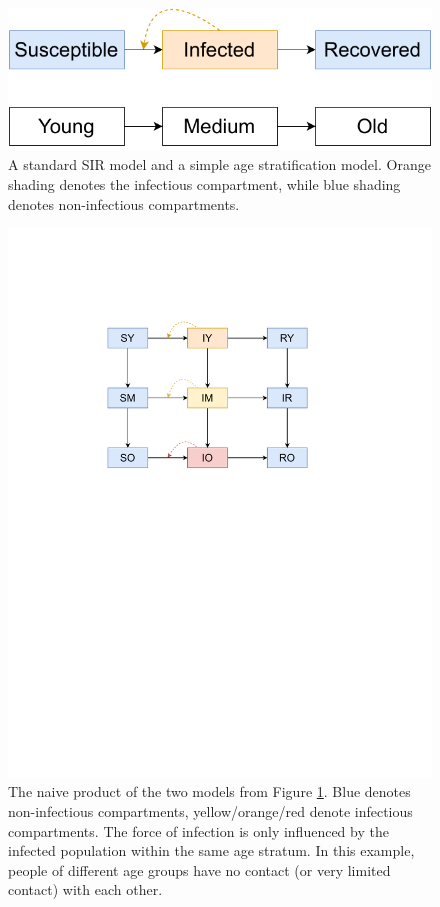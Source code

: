 \documentclass{article}
\theoremstyle{definition}
\begin{document}
\FloatBarrier
\begin{figure}
    \centering
    \includegraphics[width=\textwidth]{images_pdf/SIR_and_Age.pdf}
    \caption{A standard SIR model and a simple age stratification model. Orange shading denotes the infectious compartment, while blue shading denotes non-infectious compartments.}
    \label{fig:sir_age_strat}
\end{figure}

\begin{figure}
    \centering
    \includegraphics[width=\textwidth]{images_pdf/Age_stratified_SIR_Naive.pdf}
    \caption{The naive product of the two models from Figure \ref{fig:sir_age_strat}. Blue denotes non-infectious compartments, yellow/orange/red denote infectious compartments. The force of infection is only influenced by the infected population within the same age stratum. In this example, people of different age groups have no contact (or very limited contact) with each other.}
    \label{fig:naive_product}
\end{figure}
\end{document}
